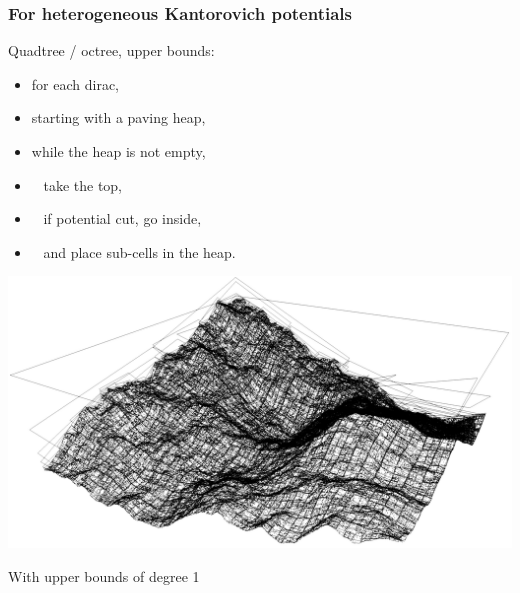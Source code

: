 \documentclass[aspectratio=169]{beamer}
\begin{document}
    
%         

\begin{frame}
    \frametitle{For heterogeneous Kantorovich potentials}

    \begin{minipage}[c][0.7\textheight][c]{0.45\textwidth}
        Quadtree / octree, upper bounds:
        \begin{itemize}
            \item for each dirac,
            \item starting with a paving heap,
            \item while the heap is not empty,
            \item \ \kern 2mm take the top,
            \item \ \kern 2mm if potential cut, go inside,
            \item \ \kern 2mm and place sub-cells in the heap.
        \end{itemize}
    \end{minipage}
    \textwidth
    \begin{minipage}[c][0.7\textheight][c]{0.5\textwidth}
        \begin{center}
            \includegraphics[width=\textwidth]{img/bound_p1.png}

            With upper bounds of degree 1
        \end{center}
    \end{minipage}
\end{frame}
\end{document}
